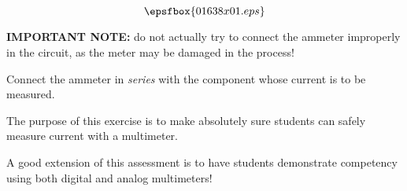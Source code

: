 

$$\epsfbox{01638x01.eps}$$

{\bf IMPORTANT NOTE:} do not actually try to connect the ammeter improperly in the circuit, as the meter may be damaged in the process!

\vfil \eject






Connect the ammeter in {\it series} with the component whose current is to be measured.







The purpose of this exercise is to make absolutely sure students can safely measure current with a multimeter.  

A good extension of this assessment is to have students demonstrate competency using both digital and analog multimeters!





